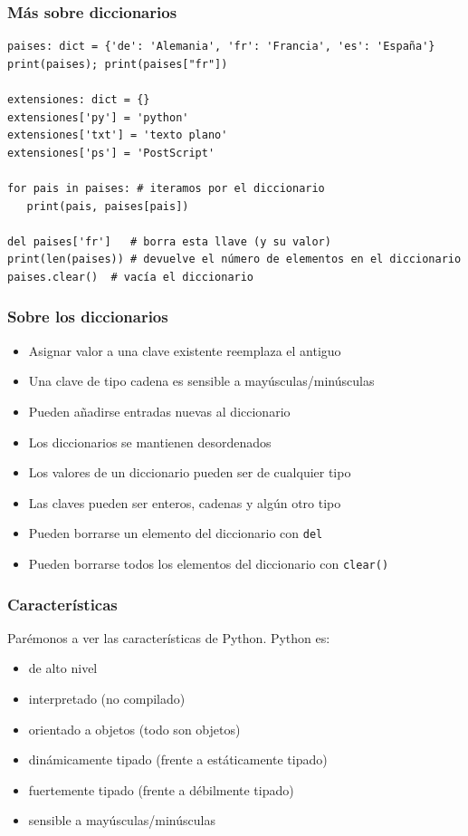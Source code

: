 \begin{frame}[fragile]
\frametitle{Más sobre diccionarios}
  \begin{footnotesize}
\begin{verbatim}
paises: dict = {'de': 'Alemania', 'fr': 'Francia', 'es': 'España'}
print(paises); print(paises["fr"])

extensiones: dict = {}
extensiones['py'] = 'python'
extensiones['txt'] = 'texto plano'
extensiones['ps'] = 'PostScript'

for pais in paises: # iteramos por el diccionario
   print(pais, paises[pais])

del paises['fr']   # borra esta llave (y su valor)
print(len(paises)) # devuelve el número de elementos en el diccionario
paises.clear()  # vacía el diccionario

\end{verbatim}
  \end{footnotesize}

\end{frame}


\begin{frame}[fragile]
\frametitle{Sobre los diccionarios}  

  \begin{itemize}
  \item Asignar valor a una clave existente reemplaza el antiguo 
  \item Una clave de tipo cadena es sensible a mayúsculas/minúsculas
  \item Pueden añadirse entradas nuevas al diccionario
  \item Los diccionarios se mantienen desordenados
\item Los valores de un diccionario pueden ser de cualquier tipo
\item Las claves pueden ser enteros, cadenas y algún otro tipo
\item Pueden borrarse un elemento del diccionario con \verb|del|
\item Pueden borrarse todos los elementos del diccionario con \verb|clear()|
\end{itemize}

\end{frame}

\begin{frame}
\frametitle{Características}

Parémonos a ver las características de Python. Python es:
\begin{itemize}
\item de alto nivel
\item interpretado (no compilado)
\item orientado a objetos (todo son objetos)
\item dinámicamente tipado (frente a estáticamente tipado)
\item fuertemente tipado (frente a débilmente tipado)
\item sensible a mayúsculas/minúsculas
\end{itemize}

\end{frame}



